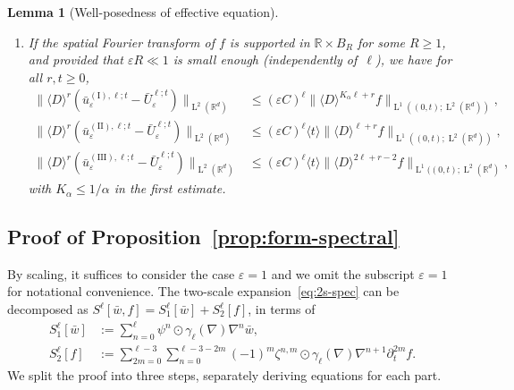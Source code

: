 \documentclass[JEP,XML,SOM,Unicode,published]{cedram}
\newenvironment{enumeratei}
{\bgroup\def\theenumi{\roman{enumi}}\def\theenumii{\arabic{enumii}}\begin{enumerate}}
{\end{enumerate}\egroup}
\theoremstyle{plain}
\newtheorem{lem0}[theor0]{Lemma}
\newenvironment{lem}
{\renewcommand{\qedsymbol}{$\lozenge$}\pushQED{\qed}\begin{lem0}}
{\popQED\end{lem0}}
\theoremstyle{definition}
\numberwithin{equation}{section}
\newcommand{\e}{\varepsilon}
\newcommand{\R}{\mathbb R}
\newcommand{\Ld}{\operatorname{L}}
\begin{document}
\begin{lem}[Well-posedness of effective equation]
\begin{enumeratei}
\item\label{lem:apriori-baru-spiii} If the spatial Fourier transform of $f$ is supported in $\R\times B_R$ for some $R\ge1$, and provided that $\e R\ll1$ is small enough (independently of~$\ell$), we have for all $r,t\ge0$,
\begin{align*}
\|\langle D\rangle^r(\bar u_\e^{\operatorname{(I)},\ell;t}-\bar U_\e^{\ell;t})\|_{\Ld^2(\R^d)}&\le (\e C)^{\ell}\|\langle D\rangle^{K_{\alpha}\ell+r}f\|_{\Ld^1((0,t);\Ld^2(\R^d))},
\\
\|\langle D\rangle^r(\bar u_\e^{\operatorname{(II)},\ell;t}-\bar U_\e^{\ell;t})\|_{\Ld^2(\R^d)}&\le (\e C)^{\ell}\langle t\rangle \|\langle D\rangle^{\ell+r}f\|_{\Ld^1((0,t);\Ld^2(\R^d))} ,
\\
\|\langle D\rangle^r(\bar u_\e^{\operatorname{(III)},\ell;t}-\bar U_\e^{\ell;t})\|_{\Ld^2(\R^d)}&\le (\e C)^{\ell}\langle t\rangle \|\langle D \rangle^{2\ell+r-2}f\|_{\Ld^1((0,t);\Ld^2(\R^d)},
\end{align*}
with {$K_{\alpha}\le1/\alpha$} in the first estimate.
\qedhere
\end{enumeratei}
\end{lem}

\subsection{Proof of Proposition~\ref{prop:form-spectral}}\label{sec:pr-prop:form-spectral}
By scaling, it suffices to consider the case $\e=1$ and we omit the subscript $\e=1$ for notational convenience. The two-scale expansion~\eqref{eq:2s-spec} can be decomposed as $S^\ell[\bar w,f]=S_1^{\ell}[\bar w]+S_2^{\ell}[f]$, in terms of\vspace*{-3pt}
\begin{align*}
S_1^{\ell}[\bar w]&:= \sum_{n=0}^\ell\psi^n \odot \gamma_{\ell}(\nabla)\nabla^n\bar w,\\
S_2^{\ell}[f]&:= \sum_{2m=0}^{\ell-3}\sum_{n=0}^{\ell-3-2m}(-1)^m\zeta^{n,m}\odot\gamma_{\ell}(\nabla) \nabla^{n+1}\partial_t^{2m} f.
\end{align*}
We split the proof into three steps, separately deriving equations for each part.
\end{document}
